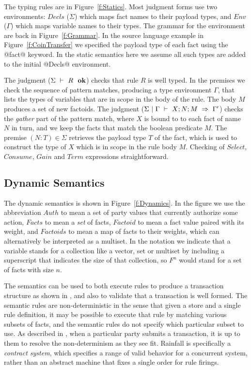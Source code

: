 The typing rules are in Figure~\ref{f:Statics}. Most judgment forms use two environments: $Decls$ ($\Sigma$) which maps fact names to their payload types, and $Env$ ($\Gamma$) which maps variable names to their types. The grammar for the environment are back in Figure~\ref{f:Grammar}. In the source language example in Figure~\ref{f:CoinTransfer} we specified the payload type of each fact using the @fact@ keyword. In the static semantics here we assume all such types are added to the initial @Decls@ environment.

The judgment ($\Sigma ~\vdash~ R~~ \textbf{ok}$) checks that rule $R$ is well typed. In the premises we check the sequence of pattern matches, producing a type environment $\Gamma$, that lists the types of variables that are in scope in the body of the rule. The body $M$ produces a set of new factoids. The judgment ($\Sigma~|~\Gamma~\vdash~X ; N ; M~\Rightarrow~\Gamma'$) checks the \emph{gather} part of the pattern match, where $X$ is bound to to each fact of name $N$ in turn, and we keep the facts that match the boolean predicate $M$. The premise $(N:T) \in \Sigma$ retrieves the payload type $T$ of the fact, which is used to construct the type of $X$ which is in scope in the rule body $M$. Checking of $Select$, $Consume$, $Gain$ and $Term$ expressions straightforward.





\subsection{Dynamic Semantics}
The dynamic semantics is shown in Figure~\ref{f:Dynamics}. In the figure we use the abbreviation $Auth$ to mean a set of party values that currently authorize some action, $Facts$ to mean a \emph{set} of facts, $Factoid$ to mean a fact value paired with its weight, and $Factoids$ to mean a map of facts to their weights, which can alternatively be interpreted as a multiset. In the notation we indicate that a variable stands for a collection like a vector, set or multiset by including a superscript that indicates the size of that collection, so $F^n$ would stand for a set of facts with size $n$.

The semantics can be used to both execute rules to produce a transaction structure as shown in \REF, and also to validate that a transaction is well formed. The semantic rules are non-deterministic in the sense that given a store and a single rule definition, it may be possible to execute that rule by matching various subsets of facts, and the semantic rules do not specify which particular subset to use. As described in \REF, when a particular party submits a transaction, it is up to them to resolve the non-determinism as they see fit. Rainfall is specifically a \emph{contract system}, which specifies a range of valid behavior for a concurrent system, rather than an abstract machine that fixes a single order for rule firings.

